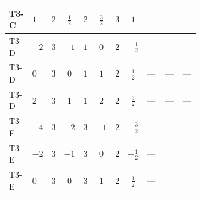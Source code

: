 \documentclass[8pt]{article}
\begin{document}
\begin{landscape}
\begin{longtable}{@{}llcccccc >{\raggedright\arraybackslash}p{0.21\linewidth} >{\raggedright\arraybackslash}p{0.21\linewidth} >{\raggedright\arraybackslash}p{0.21\linewidth}@{}}
\midrule
T3-C & $1$ & $2$ & $\frac{1}{2}$ & $2$ & $\frac{3}{2}$ & $3$ & $1$ & --- & \scriptsize\adjustbox{max width=\linewidth}{$\begin{gathered} -\frac{2}{3} \operatorname{Tr}\!\left({y_1}\,\left({y_1}\right)^{\dagger}\,{y_2}\,\left({y_2}\right)^{\dagger}\right)\end{gathered}$} & \scriptsize\adjustbox{max width=\linewidth}{$\begin{gathered} +\frac{4}{3} {\lambda_5} \left({\lambda_5}\right)^{*}\end{gathered}$} \\
\midrule
T3-D & $-2$ & $3$ & $-1$ & $1$ & $0$ & $2$ & $-\frac{1}{2}$ & --- & --- & --- \\
\midrule
T3-D & $0$ & $3$ & $0$ & $1$ & $1$ & $2$ & $\frac{1}{2}$ & --- & --- & --- \\
\midrule
T3-D & $2$ & $3$ & $1$ & $1$ & $2$ & $2$ & $\frac{3}{2}$ & --- & --- & --- \\
\midrule
T3-E & $-4$ & $3$ & $-2$ & $3$ & $-1$ & $2$ & $-\frac{3}{2}$ & --- & \scriptsize\adjustbox{max width=\linewidth}{$\begin{gathered} +\frac{2}{3} \operatorname{Tr}\!\left({y_1}\,\left({y_1}\right)^{\dagger}\,{y_2}\,\left({y_2}\right)^{\dagger}\right)\end{gathered}$} & \scriptsize\adjustbox{max width=\linewidth}{$\begin{gathered} -\frac{2}{9} {\lambda_5} \left({\lambda_5}\right)^{*}\end{gathered}$} \\
\midrule
T3-E & $-2$ & $3$ & $-1$ & $3$ & $0$ & $2$ & $-\frac{1}{2}$ & --- & \scriptsize\adjustbox{max width=\linewidth}{$\begin{gathered} +\frac{2}{3} \operatorname{Tr}\!\left({y_1}\,\left({y_1}\right)^{\dagger}\,{y_2}\,\left({y_2}\right)^{\dagger}\right)\end{gathered}$} & \scriptsize\adjustbox{max width=\linewidth}{$\begin{gathered} -\frac{2}{9} {\lambda_5} \left({\lambda_5}\right)^{*}\end{gathered}$} \\
\midrule
T3-E & $0$ & $3$ & $0$ & $3$ & $1$ & $2$ & $\frac{1}{2}$ & --- & \scriptsize\adjustbox{max width=\linewidth}{$\begin{gathered} +\frac{2}{3} \operatorname{Tr}\!\left({y_1}\,\left({y_1}\right)^{\dagger}\,{y_2}\,\left({y_2}\right)^{\dagger}\right)\end{gathered}$} & \scriptsize\adjustbox{max width=\linewidth}{$\begin{gathered} -\frac{2}{9} {\lambda_5} \left({\lambda_5}\right)^{*}\end{gathered}$} \\

\end{longtable}
\end{landscape}
\end{document}
